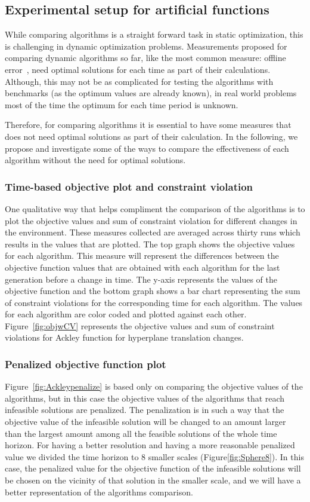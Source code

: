 \documentclass[review]{elsarticle}
\begin{document}
\subsection{Experimental setup for artificial functions}
\label{subsec:exp-setup}
While comparing algorithms is a straight forward task in static optimization, this is challenging in dynamic optimization problems. Measurements proposed for comparing dynamic algorithms so far, like the most common measure: offline error~\citep{DCOPS}, need optimal solutions for each time as part of their calculations. Although, this may not be as complicated for testing the algorithms with benchmarks (as the optimum values are already known), in real world problems most of the time the optimum for each time period is unknown.

Therefore, for comparing algorithms it is essential to have some measures that does not need optimal solutions as part of their calculation. In the following, we propose and investigate some of the ways to compare the effectiveness of each algorithm without the need for optimal solutions. 

\subsubsection{Time-based objective plot and constraint violation}
\label{subsec:timebasedplots}
One qualitative way that helps compliment the comparison of the algorithms is to plot the objective values and sum of constraint violation for different changes in the environment. These measures collected are averaged across thirty runs which results in the values that are plotted.
The top graph shows the objective values for each algorithm. This measure will represent the differences between the objective function values that are obtained with each algorithm for the last generation before a change in time.
The y-axis represents the values of the objective function and the bottom graph shows a bar chart representing the sum of constraint violations for the corresponding time for each algorithm. 
The values for each algorithm are color coded and plotted against each other.
Figure~\ref{fig:objwCV} represents the objective values and sum of constraint violations for Ackley function for hyperplane translation changes.

\subsubsection{Penalized objective function plot}
Figure~\ref{fig:Ackleypenalize} is based only on comparing the objective values of the algorithms, but in this case the objective values of the algorithms that reach infeasible solutions are penalized. The penalization is in such a way that the objective value of the infeasible solution will be changed to an amount larger than the largest amount among all the feasible solutions of the whole time horizon. 
For having a better resolution and having a more reasonable penalized value we divided the time horizon to 8 smaller scales (Figure\ref{fig:Sphere8}). In this case, the penalized value for the objective function of the infeasible solutions will be chosen on the vicinity of that solution in the smaller scale, and we will have a better representation of the algorithms comparison. 
\end{document}

